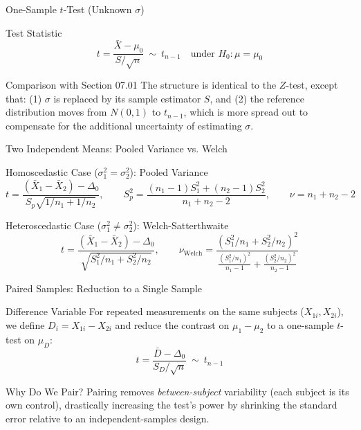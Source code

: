 \documentclass[10pt, aspectratio=169]{beamer}
\begin{document}
\begin{frame}{One-Sample $t$-Test (Unknown $\sigma$)}
  \footnotesize
  \begin{block}{Test Statistic}
    $$t = \frac{\bar X - \mu_0}{S/\sqrt n} \ \sim\ t_{n-1} \quad \text{under } H_0: \mu=\mu_0$$
  \end{block}
  \pause

  \vspace{0.1cm}
  \begin{alertblock}{Comparison with Section 07.01}
    The structure is identical to the $Z$-test, except that: (1) $\sigma$ is replaced by its sample estimator $S$, and (2) the reference distribution moves from $N(0,1)$ to $t_{n-1}$, which is more spread out to compensate for the additional uncertainty of estimating $\sigma$.
  \end{alertblock}
\end{frame}

\begin{frame}{Two Independent Means: Pooled Variance vs. Welch}
  \footnotesize
  \begin{block}{Homoscedastic Case ($\sigma_1^2=\sigma_2^2$): Pooled Variance}
    $$t = \frac{(\bar X_1-\bar X_2)-\Delta_0}{S_p\sqrt{1/n_1+1/n_2}}, \qquad S_p^2 = \frac{(n_1-1)S_1^2+(n_2-1)S_2^2}{n_1+n_2-2}, \qquad \nu=n_1+n_2-2$$
  \end{block}
  \pause

  \vspace{0.1cm}
  \begin{alertblock}{Heteroscedastic Case ($\sigma_1^2\neq\sigma_2^2$): Welch-Satterthwaite}
    $$t = \frac{(\bar X_1-\bar X_2)-\Delta_0}{\sqrt{S_1^2/n_1+S_2^2/n_2}}, \qquad \nu_{\text{Welch}} = \frac{(S_1^2/n_1+S_2^2/n_2)^2}{\frac{(S_1^2/n_1)^2}{n_1-1}+\frac{(S_2^2/n_2)^2}{n_2-1}}$$
  \end{alertblock}
\end{frame}

\begin{frame}{Paired Samples: Reduction to a Single Sample}
  \footnotesize
  \begin{block}{Difference Variable}
    For repeated measurements on the same subjects ($X_{1i}, X_{2i}$), we define $D_i=X_{1i}-X_{2i}$ and reduce the contrast on $\mu_1-\mu_2$ to a one-sample $t$-test on $\mu_D$:
    $$t = \frac{\bar D - \Delta_0}{S_D/\sqrt n} \ \sim\ t_{n-1}$$
  \end{block}
  \pause

  \vspace{0.1cm}
  \begin{alertblock}{Why Do We Pair?}
    Pairing removes \emph{between-subject} variability (each subject is its own control), drastically increasing the test's power by shrinking the standard error relative to an independent-samples design.
  \end{alertblock}
\end{frame}
\end{document}
